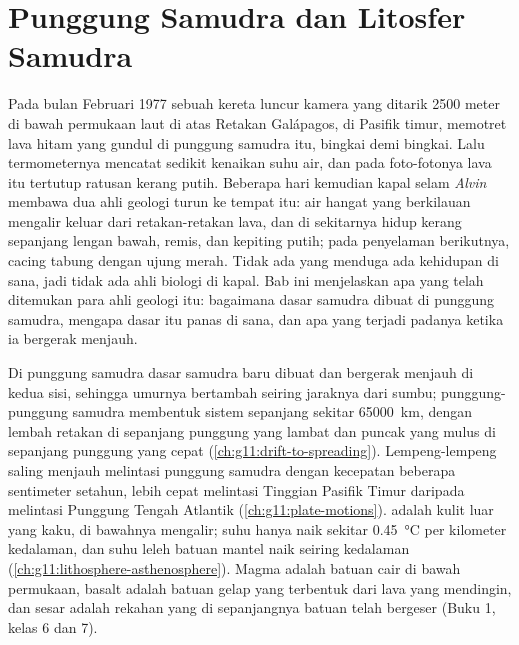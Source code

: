\chapter{Punggung Samudra dan Litosfer Samudra}\label{ch:g11:ocean-ridges}

Pada bulan Februari 1977 sebuah kereta luncur kamera yang ditarik 2500 meter di
bawah permukaan laut di atas Retakan Galápagos, di Pasifik timur, memotret lava
hitam yang gundul di punggung samudra itu, bingkai demi bingkai. Lalu
termometernya mencatat sedikit kenaikan suhu air, dan pada foto-fotonya lava itu
tertutup ratusan kerang putih. Beberapa hari kemudian kapal selam \emph{Alvin}
membawa dua ahli geologi turun ke tempat itu: air hangat yang berkilauan
mengalir keluar dari retakan-retakan lava, dan di sekitarnya hidup kerang
sepanjang lengan bawah, remis, dan kepiting putih; pada penyelaman berikutnya,
cacing tabung dengan ujung merah. Tidak ada yang menduga ada kehidupan di sana,
jadi tidak ada ahli biologi di kapal. Bab ini menjelaskan apa yang telah
ditemukan para ahli geologi itu: bagaimana dasar samudra dibuat di punggung
samudra, mengapa dasar itu panas di sana, dan apa yang terjadi padanya ketika ia
bergerak menjauh.

\begin{recall}
Di punggung samudra dasar samudra baru dibuat dan bergerak menjauh di kedua
sisi, sehingga umurnya bertambah seiring jaraknya dari sumbu; punggung-punggung
samudra membentuk sistem sepanjang sekitar \qty{65000}{km}, dengan lembah retakan
di sepanjang punggung yang lambat dan puncak yang mulus di sepanjang punggung yang
cepat (\cref{ch:g11:drift-to-spreading}). Lempeng-lempeng saling menjauh
melintasi punggung samudra dengan kecepatan beberapa sentimeter setahun, lebih
cepat melintasi Tinggian Pasifik Timur daripada melintasi Punggung Tengah
Atlantik (\cref{ch:g11:plate-motions}).  adalah kulit luar yang kaku,
 di bawahnya mengalir; suhu  hanya naik sekitar
\qty{0.45}{\celsius} per kilometer kedalaman, dan suhu leleh batuan mantel naik
seiring kedalaman (\cref{ch:g11:lithosphere-asthenosphere}). Magma adalah
batuan cair di bawah permukaan, basalt adalah batuan gelap yang terbentuk dari
lava yang mendingin, dan sesar adalah rekahan yang di sepanjangnya batuan telah
bergeser (Buku 1, kelas 6 dan 7).
\end{recall}

